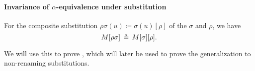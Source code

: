 \paragraph{Invariance of \( \alpha \)-equivalence under substitution}

\begin{lemma}\label{thm:renaming_composition_is_alpha_equivalent}
  For the composite substitution \( \rho\sigma(u) \coloneqq \sigma(u)[\rho] \) of the \hyperref[def:lambda_renaming]{} \( \sigma \) and \( \rho \), we have
  \begin{equation}\label{eq:thm:renaming_composition_is_alpha_equivalent}
    M[\rho\sigma] \aequiv M[\sigma][\rho].
  \end{equation}
\end{lemma}
\begin{comments}
  \item We will use this to prove , which will later be used to prove the generalization  to non-renaming substitutions.
\end{comments}
